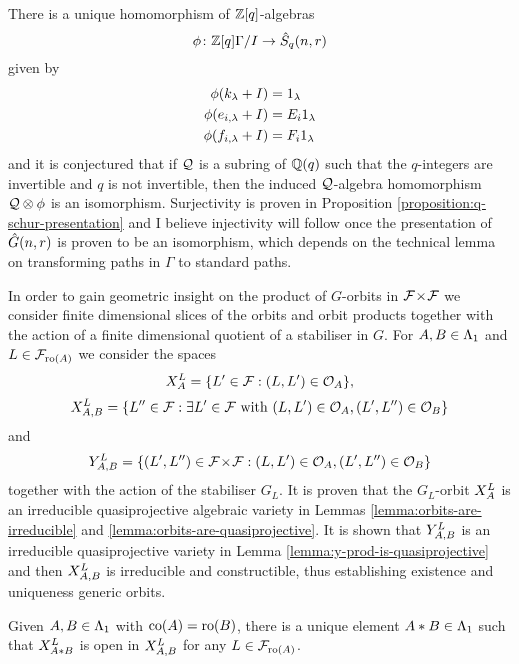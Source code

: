 \documentclass[a4paper, 11pt]{report}
\begin{document}
There is a unique homomorphism of $\integers[q]$-algebras
\begin{equation*}
\phi\colon\integers[q]\Gamma/{\qrelations}\to\qschur
\end{equation*}
given by
\begin{align*}
\phi(k_\lambda + \qrelations) &= 1_\lambda\\
\phi(e_{i,\lambda} + \qrelations) &= E_i1_\lambda\\
\phi(f_{i,\lambda} + \qrelations) &= F_i1_\lambda
\end{align*}
and it is {\color{red}conjectured} that if $\qfrac$ is a subring of $\rationals(q)$ such that the $q$-integers are invertible and $q$ is not invertible, then the induced $\qfrac$-algebra homomorphism $\qfrac\otimes\phi$ is an isomorphism. Surjectivity is proven in Proposition \ref{proposition:q-schur-presentation} and I believe injectivity will follow once the presentation of $\generic$ is proven to be an isomorphism, which depends on the technical lemma on transforming paths in $\Gamma$ to standard paths.

In order to gain geometric insight on the product of $G$-orbits in $\dblflags$ we consider finite dimensional slices of the orbits and orbit products together with the action of a finite dimensional quotient of a stabiliser in $G$. For $A,B\in\matrices$ and $L\in\flags_{\ro{A}}$ we consider the spaces
\begin{equation*}
\xprod[L]{A} = \{L'\in\flags:(L,L')\in\orbit{A}\},
\end{equation*}
\begin{equation*}
\xprod[L]{A,B} = \{L''\in\flags:\exists L'\in\flags \text{ with } (L,L')\in\orbit{A}, (L',L'')\in\orbit{B}\}
\end{equation*}
and
\begin{equation*}
\yprod[L]{A,B} = \{(L',L'')\in\dblflags:(L,L')\in\orbit{A}, (L',L'')\in\orbit{B}\}
\end{equation*}
together with the action of the stabiliser $G_L$. It is proven that the $G_L$-orbit $\xprod[L]{A}$ is an irreducible quasiprojective algebraic variety in Lemmas \ref{lemma:orbits-are-irreducible} and \ref{lemma:orbits-are-quasiprojective}. It is shown that $\yprod[L]{A,B}$ is an irreducible quasiprojective variety in Lemma \ref{lemma:y-prod-is-quasiprojective} and then $\xprod[L]{A,B}$ is irreducible and constructible, thus establishing existence and uniqueness generic orbits.

\begin{proposition*}
Given $A,B\in\matrices$ with $\co{A}=\ro{B}$, there is a unique element $A\ast B\in\matrices$ such that $\xprod[L]{A\ast B}$ is open in $\xprod[L]{A,B}$ for any $L\in\flags_{\ro{A}}$.
\end{proposition*}
\end{document}

